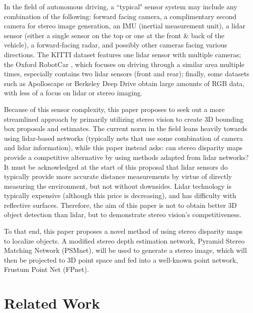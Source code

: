 In the field of autonomous driving, a ``typical" sensor system may include any combination of the following: forward facing camera, a complimentary second camera for stereo image generation, an IMU (inertial measurement unit), a lidar sensor (either a single sensor on the top or one at the front \& back of the vehicle), a forward-facing radar, and possibly other cameras facing various directions. The KITTI dataset \cite{geiger_are_2012} features one lidar sensor with multiple cameras; the Oxford RobotCar \cite{maddern_1_2017}, which focuses on driving through a similar area multiple times, especially contains two lidar sensors (front and rear); finally, some datasets such as Apolloscape \cite{huang_apolloscape_2018} or Berkeley Deep Drive \cite{yu_bdd100k:_2018} obtain large amounts of RGB data, with less of a focus on lidar or stereo imaging. 

Because of this sensor complexity, this paper proposes to seek out a more streamlined approach by primarily utilizing stereo vision to create 3D bounding box proposals and estimates. The current norm in the field leans heavily towards using lidar-based networks (typically nets that use some combination of camera and lidar information), while this paper instead asks: can stereo disparity maps provide a competitive alternative by using methods adapted from lidar networks? It must be acknowledged at the start of this proposal that lidar sensors do typically provide more accurate distance measurements by virtue of directly measuring the environment, but not without downsides. Lidar technology is typically expensive (although this price is decreasing), and has difficulty with reflective surfaces. Therefore, the aim of this paper is not to obtain better 3D object detection than lidar, but to demonstrate stereo vision's competitiveness. 

To that end, this paper proposes a novel method of using stereo disparity maps to localize objects. A modified stereo depth estimation network, Pyramid Stereo Matching Network (PSMnet), will be used to generate a stereo image, which will then be projected to 3D point space and fed into a well-known point network, Frustum Point Net (FPnet).


\section{Related Work}

